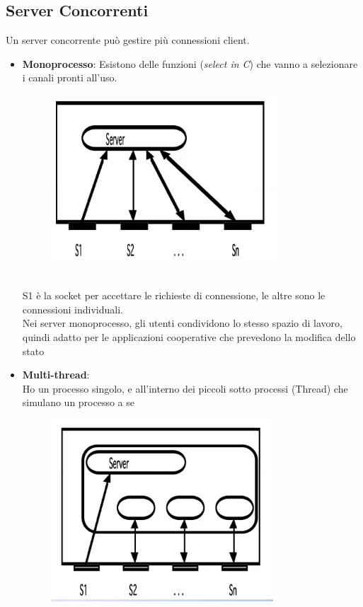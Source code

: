 \documentclass[12pt, a4paper]{article}
\begin{document}
    \subsection{Server Concorrenti}

    Un server concorrente può gestire più connessioni client.

    \begin{itemize}
        \item \textbf{Monoprocesso}:
        Esistono delle funzioni (\textit{select in C}) che vanno a selezionare i canali pronti all'uso.
        \begin{figure}[htbp]
            \centering
            \includegraphics[scale=0.7]{monoprocesso.png}
            
        \end{figure}
        \\S1 è la socket per accettare le richieste di connessione, le altre sono le connessioni individuali.
        \\Nei server monoprocesso, gli utenti condividono lo stesso spazio di lavoro, quindi adatto
        per le applicazioni cooperative che prevedono la modifica dello stato
        
        \item \textbf{Multi-thread}:
        \\Ho un processo singolo, e all'interno dei piccoli sotto processi (Thread) che simulano un processo a se

        \begin{figure}[htbp]
            \centering
            \includegraphics[scale=0.5]{multithread.png}
        \end{figure}


\end{itemize}
\end{document}
